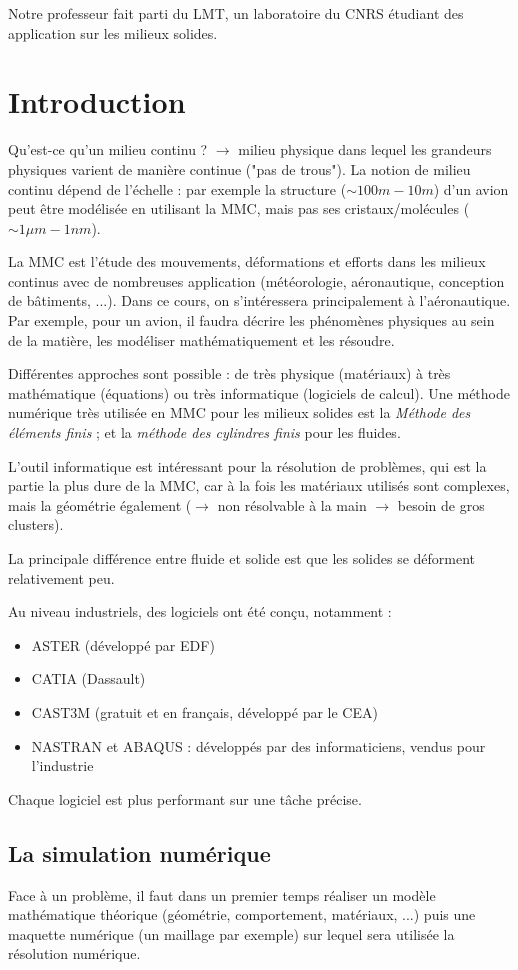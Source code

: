 \documentclass{article}
\begin{document}
Notre professeur fait parti du LMT, un laboratoire du CNRS étudiant des application sur les milieux solides.

\section{Introduction}
Qu'est-ce qu'un milieu continu ? $\to$ milieu physique dans lequel les grandeurs physiques varient de manière continue ("pas de trous"). La notion de milieu continu dépend de l'échelle : par exemple la structure ($\sim 100m-10m$) d'un avion peut être modélisée en utilisant la MMC, mais pas ses cristaux/molécules ($\sim 1 \mu m-1nm$).
\bigskip

La MMC est l'étude des mouvements, déformations et efforts dans les milieux continus avec de nombreuses application (météorologie, aéronautique, conception de bâtiments, ...). Dans ce cours, on s'intéressera principalement à l'aéronautique. Par exemple, pour un avion, il faudra décrire les phénomènes physiques au sein de la matière, les modéliser mathématiquement et les résoudre.

Différentes approches sont possible : de très physique (matériaux) à très mathématique (équations) ou très informatique (logiciels de calcul). Une méthode numérique très utilisée en MMC pour les milieux solides est la \emph{Méthode des éléments finis} ; et la \emph{méthode des cylindres finis} pour les fluides.

L'outil informatique est intéressant pour la résolution de problèmes, qui est la partie la plus dure de la MMC, car à la fois les matériaux utilisés sont complexes, mais la géométrie également ($\to$ non résolvable à la main $\to$ besoin de gros clusters).

La principale différence entre fluide et solide est que les solides se déforment relativement peu.

Au niveau industriels, des logiciels ont été conçu, notamment :
\begin{itemize}
\item ASTER (développé par EDF)
\item CATIA (Dassault)
\item CAST3M (gratuit et en français, développé par le CEA)
\item NASTRAN et ABAQUS : développés par des informaticiens, vendus pour l'industrie
\end{itemize}
Chaque logiciel est plus performant sur une tâche précise.

\subsection{La simulation numérique}
Face à un problème, il faut dans un premier temps réaliser un modèle mathématique théorique (géométrie, comportement, matériaux, ...) puis une maquette numérique (un maillage par exemple) sur lequel sera utilisée la résolution numérique.
\end{document}
